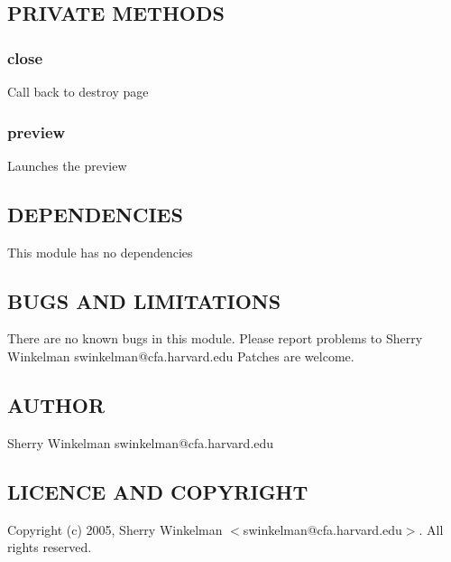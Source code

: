 \documentclass{article}
\begin{document}
\subsection*{PRIVATE METHODS\label{PrintPreview_PRIVATE_METHODS}}
\subsubsection*{close\label{PrintPreview_close}}


Call back to destroy page

\subsubsection*{preview\label{PrintPreview_preview}}


Launches the preview

\subsection*{DEPENDENCIES\label{PrintPreview_DEPENDENCIES}}


This module has no dependencies

\subsection*{BUGS AND LIMITATIONS\label{PrintPreview_BUGS_AND_LIMITATIONS}}


There are no known bugs in this module.
Please report problems to Sherry Winkelman swinkelman@cfa.harvard.edu
Patches are welcome.

\subsection*{AUTHOR\label{PrintPreview_AUTHOR}}


Sherry Winkelman swinkelman@cfa.harvard.edu

\subsection*{LICENCE AND COPYRIGHT\label{PrintPreview_LICENCE_AND_COPYRIGHT}}


Copyright (c) 2005, Sherry Winkelman $<$swinkelman@cfa.harvard.edu$>$. All rights 
reserved.
\end{document}
